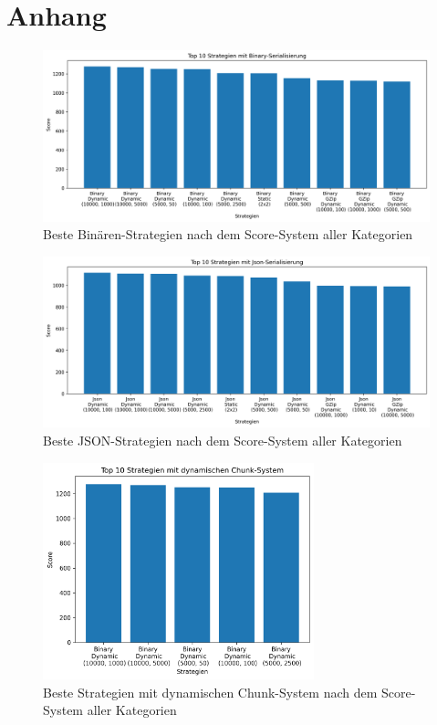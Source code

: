\chapter{Anhang}\label{ch:appendix}

\begin{figure}[htp]
    \centering
    \includegraphics[width=1\textwidth]{images/plots/Binary.png}
    \caption{Beste Binären-Strategien nach dem Score-System aller Kategorien}
    \label{fig:topStratBin}
\end{figure}

\begin{figure}[htp]
    \centering
    \includegraphics[width=1\textwidth]{images/plots/Json.png}
    \caption{Beste JSON-Strategien nach dem Score-System aller Kategorien}
    \label{fig:topStratJson}
\end{figure}

\begin{figure}[htp]
    \centering
    \includegraphics[width=0.7\textwidth]{images/plots/dynamisch.png}
    \caption{Beste Strategien mit dynamischen Chunk-System nach dem Score-System aller Kategorien}
    \label{fig:topDynamic}
\end{figure}

